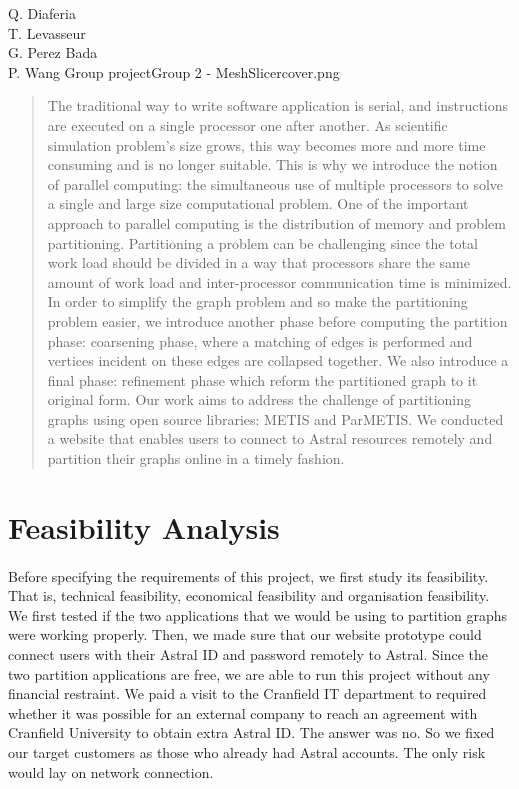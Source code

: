 \documentclass{cranfieldChart}
\begin{document}
{Q. Diaferia\\
T. Levasseur\\
G. Perez Bada\\
P. Wang
}{Group project}{Group 2 - MeshSlicer}{cover.png}

\newpage
\tableofcontents
\newpage

\begin{abstract}
The traditional way to write software application is serial, and instructions are executed on a single processor one after another.
As scientific simulation problem's size grows, this way becomes more and more time consuming and is no longer suitable. This is why we introduce the notion of parallel computing: the simultaneous use of multiple processors to solve a single and large size computational problem. One of the important approach to parallel computing is the distribution of memory and problem partitioning. Partitioning a problem can be challenging since the total work load should be divided in a way that processors share the same amount of work load and inter-processor communication time is minimized. In order to simplify the graph problem and so make the partitioning problem easier, we introduce another phase before computing the partition phase: coarsening phase, where a matching of edges is performed and vertices incident on these edges are collapsed together. We also introduce a final phase: refinement phase which reform the partitioned graph to it original form. Our work aims to address the challenge of partitioning graphs using open source libraries: METIS and ParMETIS. We conducted a website that enables users to connect to Astral resources remotely and partition their graphs online in a timely fashion. 
\end{abstract}

\section{Feasibility Analysis} 
\paragraph{}
Before specifying the requirements of this project, we first study its feasibility. That is, technical feasibility, economical feasibility and organisation feasibility. We first tested if the two applications that we would be using to partition graphs were working properly. Then, we made sure that our website prototype could connect users with their Astral ID and password remotely to Astral. Since the two partition applications are free, we are able to run this project without any financial restraint. We paid a visit to the Cranfield IT department to required whether it was possible for an external company to reach an agreement with Cranfield University to obtain extra Astral ID. The answer was no. So we fixed our target customers as those who already had Astral accounts. The only risk would lay on network connection. 
\end{document}
